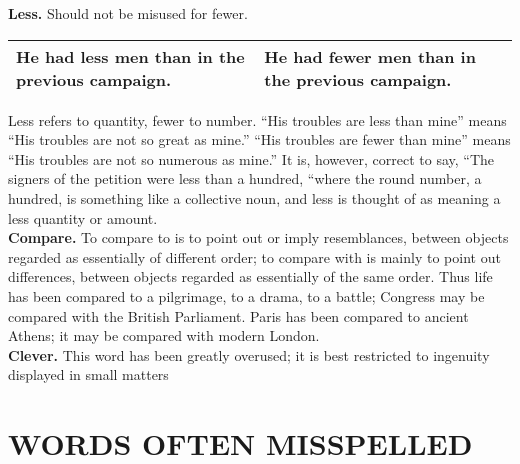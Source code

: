 \documentclass[10pt]{report}
\begin{document}
\noindent
{\bfseries Less.} Should not be misused for fewer.
\begin{table}[!tbh]
    \centering
        \begin{tabular}{|m{18em}|m{18em}|}
        \hline
        He had less men than in the previous
campaign. &
He had fewer men than in the
previous campaign.\\
\hline
 \end{tabular}
 \end{table}
 
\noindent
Less refers to quantity, fewer to number. “His troubles are less than mine” means
“His troubles are not so great as mine.” “His troubles are fewer than mine”
means “His troubles are not so numerous as mine.” It is, however, correct to say,
“The signers of the petition were less than a hundred, “where the round number,
a hundred, is something like a collective noun, and less is thought of as meaning
a less quantity or amount.\\


\noindent
{\bfseries Compare.} To compare to is to point out or imply resemblances, between objects regarded
as essentially of different order; to compare with is mainly to point out
differences, between objects regarded as essentially of the same order. Thus
life has been compared to a pilgrimage, to a drama, to a battle; Congress may
be compared with the British Parliament. Paris has been compared to ancient
Athens; it may be compared with modern London.\\

\noindent
{\bfseries Clever.} This word has been greatly overused; it is best restricted to ingenuity displayed
in small matters\\

\newpage
\chapter {WORDS OFTEN MISSPELLED}
\end{document}
